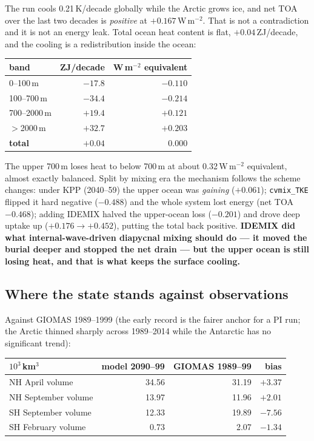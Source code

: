 \documentclass[10pt]{article}
\begin{document}
The run cools 0.21\,K/decade globally while the Arctic grows ice, and net TOA over the last two
decades is \emph{positive} at $+0.167$\,W\,m$^{-2}$. That is not a contradiction and it is not
an energy leak. Total ocean heat content is flat, $+0.04$\,ZJ/decade, and the cooling is a
redistribution inside the ocean:

\begin{center}
\begin{tabular}{lrr}
\hline
band & ZJ/decade & W\,m$^{-2}$ equivalent \\
\hline
0--100\,m     & $-17.8$ & $-0.110$ \\
100--700\,m   & $-34.4$ & $-0.214$ \\
700--2000\,m  & $+19.4$ & $+0.121$ \\
$>$2000\,m    & $+32.7$ & $+0.203$ \\
\hline
\textbf{total} & $+0.04$ & $0.000$ \\
\hline
\end{tabular}
\end{center}

The upper 700\,m loses heat to below 700\,m at about 0.32\,W\,m$^{-2}$ equivalent, almost
exactly balanced. Split by mixing era the mechanism follows the scheme changes: under KPP
(2040--59) the upper ocean was \emph{gaining} ($+0.061$); \texttt{cvmix\_TKE} flipped it hard
negative ($-0.488$) and the whole system lost energy (net TOA $-0.468$); adding IDEMIX halved
the upper-ocean loss ($-0.201$) and drove deep uptake up ($+0.176\to+0.452$), putting the total
back positive. \textbf{IDEMIX did what internal-wave-driven diapycnal mixing should do --- it
moved the burial deeper and stopped the net drain --- but the upper ocean is still losing heat,
and that is what keeps the surface cooling.}

\subsection{Where the state stands against observations}\label{sub:r40obs}

Against GIOMAS 1989--1999 (the early record is the fairer anchor for a PI run; the Arctic
thinned sharply across 1989--2014 while the Antarctic has no significant trend):

\begin{center}
\begin{tabular}{lrrr}
\hline
$10^3$\,km$^3$ & model 2090--99 & GIOMAS 1989--99 & bias \\
\hline
NH April volume     & 34.56 & 31.19 & $+3.37$ \\
NH September volume & 13.97 & 11.96 & $+2.01$ \\
SH September volume & 12.33 & 19.89 & $\mathbf{-7.56}$ \\
SH February volume  & 0.73  & 2.07  & $\mathbf{-1.34}$ \\
\hline
\end{tabular}
\end{center}
\end{document}
